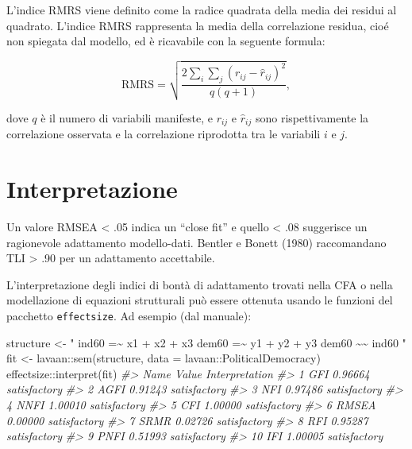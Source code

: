 \documentclass[
  11pt,
]{krantz}
\makeatletter
\newenvironment{Shaded}{\begin{snugshade}}{\end{snugshade}}
\newcommand{\AttributeTok}[1]{\textcolor[rgb]{0.61,0.61,0.61}{#1}}
\newcommand{\CommentTok}[1]{\textcolor[rgb]{0.37,0.37,0.37}{\textit{#1}}}
\newcommand{\FunctionTok}[1]{\textcolor[rgb]{0,0,0}{#1}}
\newcommand{\NormalTok}[1]{#1}
\newcommand{\OtherTok}[1]{\textcolor[rgb]{0.37,0.37,0.37}{#1}}
\newcommand{\SpecialCharTok}[1]{\textcolor[rgb]{0,0,0}{#1}}
\newcommand{\StringTok}[1]{\textcolor[rgb]{0.5,0.5,0.5}{#1}}
\newenvironment{kframe}{%
\medskip{}
\setlength{\fboxsep}{.8em}
 \def\at@end@of@kframe{}%
 \ifinner\ifhmode%
  \def\at@end@of@kframe{\end{minipage}}%
  \begin{minipage}{\columnwidth}%
 \fi\fi%
 \def\FrameCommand##1{\hskip\@totalleftmargin \hskip-\fboxsep
 \colorbox{shadecolor}{##1}\hskip-\fboxsep
     \hskip-\linewidth \hskip-\@totalleftmargin \hskip\columnwidth}%
 \MakeFramed {\advance\hsize-\width
   \@totalleftmargin\z@ \linewidth\hsize
   \@setminipage}}%
 {\par\unskip\endMakeFramed%
 \at@end@of@kframe}
\renewenvironment{Shaded}{\begin{kframe}}{\end{kframe}}
\theoremstyle{definition}
\theoremstyle{definition}
\theoremstyle{definition}
\theoremstyle{definition}
\theoremstyle{remark}
\makeatother
\begin{document}
L'indice RMRS viene definito come la radice quadrata della media dei residui al quadrato. L'indice RMRS rappresenta la media della correlazione residua, cioé non spiegata dal modello, ed è ricavabile con la seguente formula:

\begin{equation}
\mbox{RMRS} = \sqrt{ \frac{2 \sum_i\sum_j(r_{ij} - \hat{r}_{ij})^2}{q(q+1)}},
\end{equation}

dove \(q\) è il numero di variabili manifeste, e \(r_{ij}\) e \(\hat{r}_{ij}\) sono rispettivamente la correlazione osservata e la correlazione riprodotta tra le variabili \(i\) e \(j\).

\hypertarget{interpretazione-1}{%
\section{Interpretazione}\label{interpretazione-1}}

Un valore RMSEA \textless{} .05 indica un ``close fit'' e quello \textless{} .08 suggerisce un ragionevole adattamento modello-dati. Bentler e Bonett (1980) raccomandano TLI \textgreater{} .90 per un adattamento accettabile.

L'interpretazione degli indici di bontà di adattamento trovati nella CFA o nella modellazione di equazioni strutturali può essere ottenuta usando le funzioni del pacchetto \texttt{effectsize}. Ad esempio (dal manuale):

\begin{Shaded}
\begin{Highlighting}[]
\NormalTok{structure }\OtherTok{\textless{}{-}} \StringTok{" ind60 =\textasciitilde{} x1 + x2 + x3}
\StringTok{               dem60 =\textasciitilde{} y1 + y2 + y3}
\StringTok{               dem60 \textasciitilde{}\textasciitilde{} ind60 "}
\NormalTok{fit }\OtherTok{\textless{}{-}}\NormalTok{ lavaan}\SpecialCharTok{::}\FunctionTok{sem}\NormalTok{(structure, }\AttributeTok{data =}\NormalTok{ lavaan}\SpecialCharTok{::}\NormalTok{PoliticalDemocracy)}
\NormalTok{effectsize}\SpecialCharTok{::}\FunctionTok{interpret}\NormalTok{(fit)}
\CommentTok{\#\textgreater{}     Name   Value Interpretation}
\CommentTok{\#\textgreater{} 1    GFI 0.96664   satisfactory}
\CommentTok{\#\textgreater{} 2   AGFI 0.91243   satisfactory}
\CommentTok{\#\textgreater{} 3    NFI 0.97486   satisfactory}
\CommentTok{\#\textgreater{} 4   NNFI 1.00010   satisfactory}
\CommentTok{\#\textgreater{} 5    CFI 1.00000   satisfactory}
\CommentTok{\#\textgreater{} 6  RMSEA 0.00000   satisfactory}
\CommentTok{\#\textgreater{} 7   SRMR 0.02726   satisfactory}
\CommentTok{\#\textgreater{} 8    RFI 0.95287   satisfactory}
\CommentTok{\#\textgreater{} 9   PNFI 0.51993   satisfactory}
\CommentTok{\#\textgreater{} 10   IFI 1.00005   satisfactory}
\end{Highlighting}
\end{Shaded}
\end{document}
